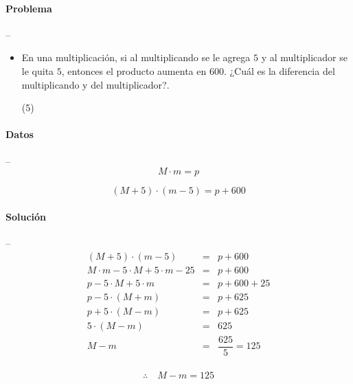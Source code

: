 \documentclass[12pt, a4paper]{article}
\begin{document}
\paragraph*{Problema} -- \\
\begin{itemize}
	\item{En una multiplicación, si al multiplicando se le agrega $5$ y al multiplicador se le quita $5$, entonces el producto aumenta en $600$. ¿Cuál es la diferencia del multiplicando y del multiplicador?.

	\begin{tasks}(5)
	\end{tasks}
	}
\end{itemize}
\paragraph*{Datos} -- \\

$$
M \cdot m = p
$$

$$
(M + 5)\cdot (m - 5) = p + 600 
$$

\paragraph*{Solución} -- 
\begin{eqnarray*}
(M + 5) \cdot (m - 5) &=& p + 600  \\
M\cdot m - 5\cdot M + 5\cdot m - 25 &=& p + 600 \\
p - 5\cdot M + 5\cdot m &=& p + 600 + 25\\
p - 5 \cdot (M + m) &=& p + 625 \\
p + 5 \cdot (M - m) &=& p + 625 \\
5 \cdot (M - m) &=& 625 \\
M - m &=& \dfrac{625}{5} = 125 \\
\end{eqnarray*}

$$
\therefore\quad M - m = 125
$$
\end{document}
